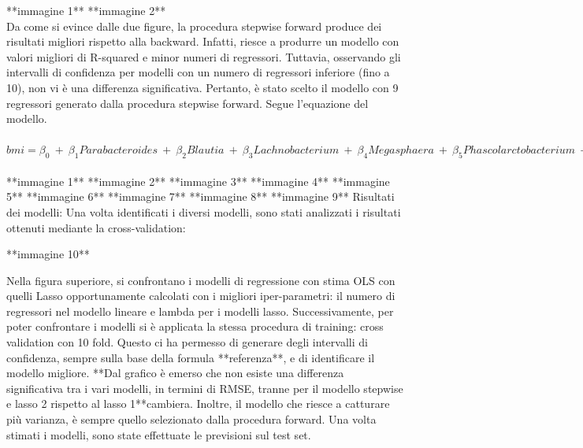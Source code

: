 **immagine 1**
**immagine 2**
\\
Da come si evince dalle due figure, la procedura stepwise forward produce dei risultati migliori rispetto alla backward. Infatti, riesce  a produrre un modello con valori migliori di R-squared e minor numeri di regressori. Tuttavia, osservando gli intervalli di confidenza per modelli con un numero di regressori inferiore (fino a 10), non vi è una differenza significativa. Pertanto, è stato scelto il modello con 9 regressori generato dalla procedura stepwise forward. Segue l'equazione del modello. 
\\
\\
$bmi = \beta_0 \:+\: \beta_1 Parabacteroides\: +\: \beta_2 Blautia \:+\: \beta_3 Lachnobacterium\: +\: \beta_4 Megasphaera \: +\: \beta_5 Phascolarctobacterium \: +\: \beta_6 Veilonella\: +\: \beta_7 Catenibacterium \:+\: \beta_8 age\:+\: \beta_9 sex\: +\: \epsilon$
\\
\\
**immagine 1**
**immagine 2**
**immagine 3**
**immagine 4**
**immagine 5**
**immagine 6**
**immagine 7**
**immagine 8**
**immagine 9**
Risultati dei modelli: 
Una volta identificati i diversi modelli, sono stati analizzati i risultati ottenuti mediante la cross-validation: 

**immagine 10**

Nella figura superiore, si confrontano i modelli di regressione con stima OLS con quelli Lasso opportunamente calcolati con i migliori iper-parametri: il numero di regressori nel modello lineare e lambda per i modelli lasso.  Successivamente, per poter confrontare i modelli si è applicata la stessa procedura di training: cross validation con 10 fold. Questo ci ha permesso di generare degli intervalli di confidenza, sempre sulla base della formula **referenza**, e di identificare il modello migliore. **Dal grafico è emerso che non esiste una differenza significativa tra i vari modelli, in termini di RMSE, tranne per il modello stepwise  e lasso 2 rispetto al lasso 1**cambiera. Inoltre, il modello che riesce a catturare più varianza, è sempre quello selezionato dalla procedura forward. Una volta stimati i modelli, sono state effettuate le previsioni sul test set. 

